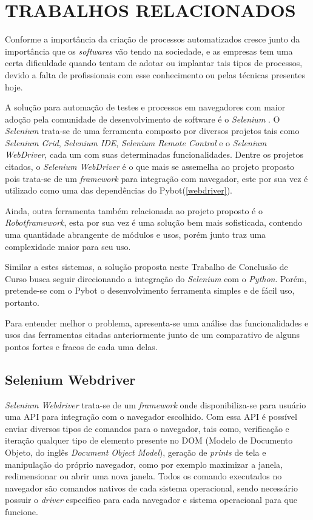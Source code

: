 %
%

\chapter{TRABALHOS RELACIONADOS}\label{chap:relacionados}

    Conforme \cite{dos2016estudo} a importância da criação de processos automatizados cresce junto da importância que os \emph{softwares} vão tendo na sociedade, e as empresas
    tem uma certa dificuldade quando tentam de adotar ou implantar tais tipos de processos, devido a falta de profissionais com esse conhecimento ou pelas técnicas presentes hoje.

    A solução para automação de testes e processos em navegadores com maior adoção pela comunidade de desenvolvimento de software é o \emph{Selenium} \cite{selenium}.
    O \emph{Selenium} trata-se de uma ferramenta composto por diversos projetos tais como \emph{Selenium Grid}, \emph{Selenium IDE}, \emph{Selenium Remote Control} e o \emph{Selenium WebDriver},
    cada um com suas determinadas funcionalidades. Dentre os projetos citados, o \emph{Selenium WebDriver} é o que mais se assemelha ao projeto proposto pois trata-se de um \emph{framework} para
    integração com navegador, este por sua vez é utilizado como uma das dependências do Pybot(\ref{webdriver}).

    Ainda, outra ferramenta também relacionada ao projeto proposto é o \emph{Robotframework}, esta por sua vez é uma solução bem mais sofisticada, contendo uma quantidade abrangente de módulos
    e usos, porém junto traz uma complexidade maior para seu uso.

    Similar a estes sistemas, a solução proposta neste Trabalho de Conclusão de Curso busca seguir direcionando a integração do \emph{Selenium} com o \emph{Python}. Porém, pretende-se com o Pybot o
    desenvolvimento ferramenta simples e de fácil uso, portanto.

    Para entender melhor o problema, apresenta-se uma análise das funcionalidades e usos das ferramentas citadas anteriormente junto de um comparativo de alguns pontos fortes e
    fracos de cada uma delas.

    \section{Selenium Webdriver}

        \emph{Selenium Webdriver} \cite{webdriver} trata-se de um \emph{framework} onde disponibiliza-se para usuário uma API para integração com o navegador escolhido. Com essa API é possível enviar
        diversos tipos de comandos para o navegador, tais como, verificação e iteração qualquer tipo de elemento presente no DOM (Modelo de Documento Objeto, do inglês \emph{Document Object Model}),
        geração de \emph{prints} de tela e manipulação do próprio navegador, como por exemplo maximizar a janela, redimensionar ou abrir uma nova janela. Todos os comando executados no navegador
        são comandos nativos de cada sistema operacional, sendo necessário possuir o \emph{driver} especifico para cada navegador e sistema operacional para que funcione.

